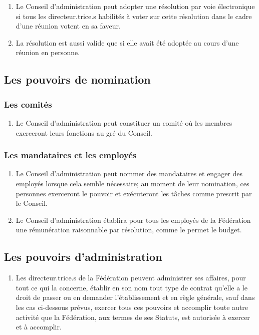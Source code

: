 \begin{enumerate}
 \item
  Le Conseil d'administration peut adopter une résolution par voie électronique si tous les directeur.trice.s habilités à voter sur cette résolution dans le cadre d'une réunion votent en sa faveur.
 \item
  La résolution est aussi valide que si elle avait été adoptée au cours d'une réunion en personne.
\end{enumerate}

\subsection{Les pouvoirs de nomination}
\label{les-pouvoirs-de-nomination}

\subsubsection{Les comités}
\label{les-comites}

\begin{enumerate}
 \item
  Le Conseil d'administration peut constituer un comité où les membres exerceront leurs fonctions au gré du Conseil.
\end{enumerate}

\subsubsection{Les mandataires et les employés}
\label{les-mandataires-et-les-employes}

\begin{enumerate}
 \item
  Le Conseil d'administration peut nommer des mandataires et engager des employés lorsque cela semble nécessaire; au moment de leur nomination, ces personnes exerceront le pouvoir et exécuteront les tâches comme prescrit par le Conseil.
 \item
  Le Conseil d'administration établira pour tous les employés de la Fédération une rémunération raisonnable par résolution, comme le permet le budget.
\end{enumerate}

\subsection{Les pouvoirs d'administration}
\label{les-pouvoirs-dadministration}

\begin{enumerate}
 \item
  Les directeur.trice.s de la Fédération peuvent administrer ses affaires, pour tout ce qui la concerne, établir en son nom tout type de contrat qu'elle a le droit de passer ou en demander l'établissement et en règle générale, sauf dans les cas ci-dessous prévus, exercer tous ces pouvoirs et accomplir toute autre activité que la Fédération, aux termes de ses Statuts, est autorisée à exercer et à accomplir.
\end{enumerate}

